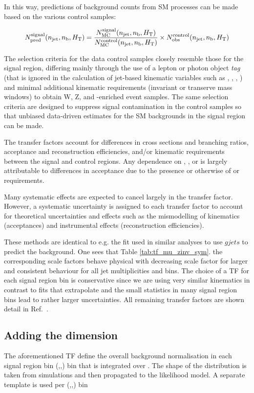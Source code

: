 In this way, predictions of background counts from SM processes can be
made based on the various control samples:

\begin{equation}
  \label{equ:pred-method}
  N_{\textrm{pred}}^{\rm signal}(n_{\text{jet}},n_{\text{b}},\mbox{$H_\text{T}$}) = \frac{N_{\rm MC}^{\rm
      signal}(n_{\text{jet}},n_{\text{b}},\mbox{$H_\text{T}$})}{N_{\rm MC}^{\rm
      control}(n_{\text{jet}},n_{\text{b}},\mbox{$H_\text{T}$})} \times N_{\textrm{obs}}^{\rm
    control}(n_{\text{jet}},n_{\text{b}},\mbox{$H_\text{T}$})   
\end{equation}


The selection criteria for the data control samples closely resemble
those for the signal region, differing mainly through the use of a
lepton or photon object {\it tag} (that is ignored in the calculation
of jet-based kinematic variables such as \scalht, \mht, \alphat, \etc)
and minimal additional kinematic requirements (\eg invariant or
transerve mass windows) to obtain W, Z, and \ttbar-enriched event
samples. The same selection criteria are designed to suppress signal
contamination in the control samples so that unbiased data-driven
estimates for the SM backgrounds in the signal region can be
made. 

The transfer factors account for differences in cross sections and
branching ratios, acceptance and reconstruction efficiencies, and/or
kinematic requirements between the signal and control regions. Any
dependence on \njet, \nb, or \HT is largely attributable to
differences in acceptance due to the presence or otherwise of \alphat
or \mht requirements.

Many systematic effects are expected to cancel largely in the transfer
factor. However, a systematic uncertainty is assigned to each transfer
factor to account for theoretical uncertainties and effects such as
the mismodelling of kinematics (\eg acceptances) and instrumental
effects (\eg reconstruction efficiencies).

These methods are identical to e.g. the fit used in similar analyses to use $gjets$ to predict the \znunu background. One sees that Table \ref{tab:tf_mu_zinv_sym}. the corresponding scale factors behave physical with decreasing scale factor for larger \HT and consistent behaviour for all jet multiplicities and \HT bins. 
The choice of a TF for each signal region bin is conservative since we are using very similar kinematics in contrast to fits that extrapolate and the small statistics in many signal region bins lead to rather larger uncertainties. All remaining transfer factors are shown detail in Ref.~\cite{alphaTnote}. 




\subsection{Adding the \mht dimension}

The aforementioned TF define the overall background normalisation in each signal region bin (\njet,\nb,\HT) bin that is
integrated over \mht. The shape of the \mht distribution is taken from simulations and then propagated to the likelihood model. 
A separate \mht template is used per (\njet,\nb,\HT) bin


